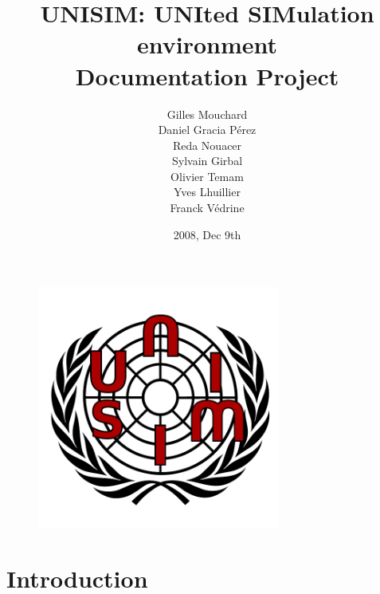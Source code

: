 \documentclass[a4paper,11pt,onecolumn]{mathese}
\begin{document}
\setlength{\parskip}{0.5em}%
\baselineskip 14pt


\title{\bf \huge UNISIM: UNIted SIMulation environment\\Documentation Project}
\author{Gilles Mouchard \\Daniel Gracia P\'erez\\Reda Nouacer\\Sylvain Girbal\\Olivier Temam\\Yves Lhuillier \\Franck V\'edrine}
\date{2008, Dec 9th}

\begin{titlepage}
\begin{figure}
\begin{center}
\includegraphics[width=8cm]{logo_unisim.pdf}
\maketitle
\end{center}
\end{figure}
\end{titlepage}
%
%


\tableofcontents {}
\listoffigures

\mainmatter

\chapter{Introduction}
\label{introduction}

\end{document}
